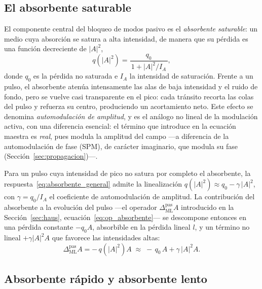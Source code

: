 \subsection{El absorbente saturable}
\label{sec:absorbente}

El componente central del bloqueo de modos pasivo es el \emph{absorbente
saturable}: un medio cuya absorción se satura a alta intensidad, de manera que su
pérdida es una función decreciente de $|A|^2$,
%
\begin{equation}
    q\!\left(|A|^2\right) = \frac{q_0}{\,1 + |A|^2/I_A\,},
    \label{eq:absorbente_general}
\end{equation}
%
donde $q_0$ es la pérdida no saturada e $I_A$ la intensidad de saturación. Frente a
un pulso, el absorbente atenúa intensamente las alas de baja intensidad y el ruido
de fondo, pero se vuelve casi transparente en el pico: cada tránsito recorta las
colas del pulso y refuerza su centro, produciendo un acortamiento neto. Este efecto
se denomina \emph{automodulación de amplitud}, y es el análogo no lineal de la
modulación activa, con una diferencia esencial: el término que introduce en la
ecuación maestra es \emph{real}, pues modula la amplitud del campo —a diferencia
de la automodulación de fase (SPM), de carácter imaginario, que modula su fase
(Sección~\ref{sec:propagacion})—.

Para un pulso cuya intensidad de pico no satura por completo el absorbente, la
respuesta~\eqref{eq:absorbente_general} admite la linealización
$q(|A|^2)\approx q_0-\gamma\,|A|^2$, con $\gamma = q_0/I_A$ el coeficiente de
automodulación de amplitud. La contribución del absorbente a la evolución del pulso
—el operador $\Delta_{\mathrm{ML}}^{\text{pas}}A$ introducido en la
Sección~\ref{sec:haus}, ecuación~\eqref{eq:op_absorbente}— se descompone entonces
en una pérdida constante $-q_0 A$, absorbible en la pérdida lineal $l$, y un
término no lineal $+\gamma|A|^2A$ que favorece las intensidades altas:
%
\begin{equation}
    \Delta_{\mathrm{ML}}^{\text{pas}} A
    = -\,q\!\left(|A|^2\right) A
    \;\approx\; -\,q_0\,A + \gamma\,|A|^2 A .
    \label{eq:op_absorbente_rapido}
\end{equation}

\subsection{Absorbente rápido y absorbente lento}
\label{sec:absorbente_tipos}

